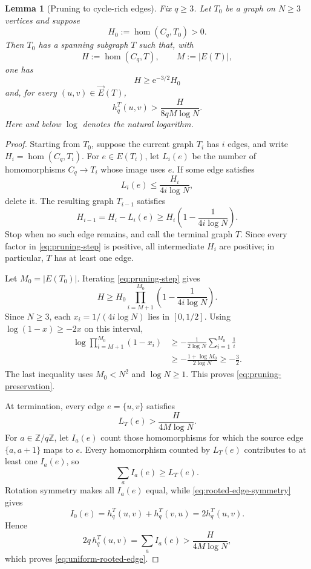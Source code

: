\documentclass[11pt]{article}
\newtheorem{lemma}[theorem]{Lemma}
\theoremstyle{definition}
\theoremstyle{remark}
\newcommand{\homn}{\operatorname{hom}}
\newcommand{\e}{\mathrm{e}}
\begin{document}
\begin{lemma}[Pruning to cycle-rich edges]
  \label{lem:pruning}
  Fix $q\ge3$.  Let $T_0$ be a graph on $N\ge3$ vertices and suppose
  \[
    H_0:=\homn(C_q,T_0)>0.
  \]
  Then $T_0$ has a spanning subgraph $T$ such that, with
  \[
    H:=\homn(C_q,T),
    \qquad
    M:=|E(T)|,
  \]
  one has
  \begin{equation}
    H\ge\e^{-3/2}H_0
    \label{eq:pruning-preservation}
  \end{equation}
  and, for every $(u,v)\in\vec E(T)$,
  \begin{equation}
    h_q^T(u,v)>
    \frac{H}{8qM\log N}.
    \label{eq:uniform-rooted-edge}
  \end{equation}
  Here and below $\log$ denotes the natural logarithm.
\end{lemma}

\begin{proof}
  Starting from $T_0$, suppose the current graph $T_i$ has $i$ edges,
  and write $H_i=\homn(C_q,T_i)$.  For $e\in E(T_i)$, let $L_i(e)$ be
  the number of homomorphisms $C_q\to T_i$ whose image uses $e$.
  If some edge satisfies
  \[
    L_i(e)\le\frac{H_i}{4i\log N},
  \]
  delete it.  The resulting graph $T_{i-1}$ satisfies
  \begin{equation}
    H_{i-1}=H_i-L_i(e)
    \ge H_i\left(1-\frac1{4i\log N}\right).
    \label{eq:pruning-step}
  \end{equation}
  Stop when no such edge remains, and call the terminal graph $T$.
  Since every factor in \eqref{eq:pruning-step} is positive, all
  intermediate $H_i$ are positive; in particular, $T$ has at least one
  edge.

  Let $M_0=|E(T_0)|$.  Iterating \eqref{eq:pruning-step} gives
  \[
    H\ge
    H_0\prod_{i=M+1}^{M_0}
    \left(1-\frac1{4i\log N}\right).
  \]
  Since $N\ge3$, each $x_i=1/(4i\log N)$ lies in $[0,1/2]$.
  Using $\log(1-x)\ge-2x$ on this interval,
  \[
  \begin{aligned}
    \log\prod_{i=M+1}^{M_0}(1-x_i)
    &\ge-\frac1{2\log N}\sum_{i=1}^{M_0}\frac1i\\
    &\ge-\frac{1+\log M_0}{2\log N}
    \ge-\frac32.
  \end{aligned}
  \]
  The last inequality uses $M_0<N^2$ and $\log N\ge1$.  This proves
  \eqref{eq:pruning-preservation}.

  At termination, every edge $e=\{u,v\}$ satisfies
  \[
    L_T(e)>\frac{H}{4M\log N}.
  \]
  For $a\in\mathbb{Z}/q\mathbb{Z}$, let $I_a(e)$ count those
  homomorphisms for which the source edge $\{a,a+1\}$ maps to $e$.
  Every homomorphism counted by $L_T(e)$ contributes to at least one
  $I_a(e)$, so
  \[
    \sum_a I_a(e)\ge L_T(e).
  \]
  Rotation symmetry makes all $I_a(e)$ equal, while
  \eqref{eq:rooted-edge-symmetry} gives
  \[
    I_0(e)=h_q^T(u,v)+h_q^T(v,u)=2h_q^T(u,v).
  \]
  Hence
  \[
    2q\,h_q^T(u,v)
    =\sum_aI_a(e)
    >\frac{H}{4M\log N},
  \]
  which proves \eqref{eq:uniform-rooted-edge}.
\end{proof}
\end{document}
